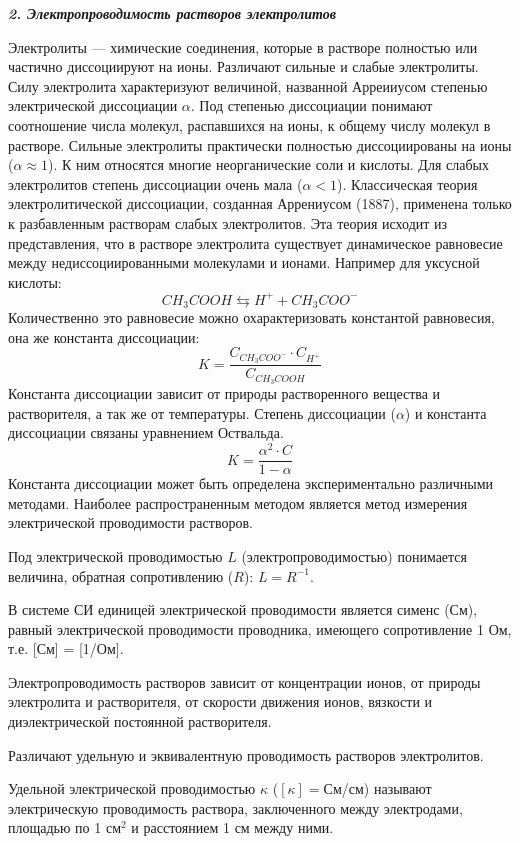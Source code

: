 \textit{\textbf{2. Электропроводимость растворов электролитов}}

Электролиты --- химические соединения,  которые в  растворе  полностью или частично диссоциируют на ионы. Различают сильные и слабые электролиты. Силу электролита характеризуют величиной, названной Арреииусом степенью электрической диссоциации $\alpha$. Под степенью диссоциации понимают соотношение числа молекул, распавшихся на ионы, к общему числу молекул в растворе. Сильные электролиты практически полностью диссоциированы на ионы ($\alpha\approx 1$). К ним относятся многие неорганические соли и кислоты. Для слабых электролитов степень диссоциации очень мала ($\alpha<1$).
Классическая теория  электролитической диссоциации,  созданная Аррениусом (1887),  применена только к разбавленным растворам слабых электролитов. Эта теория исходит из представления, что в растворе электролита существует динамическое равновесие между недиссоциированными молекулами и ионами. Например для уксусной кислоты:
$$CH_{3}COOH\leftrightarrows H^{+}+CH_{3}COO^{-}$$
Количественно это  равновесие можно охарактеризовать константой равновесия, она же константа диссоциации:
$$K=\frac{C_{CH_{3}COO^{-}}\cdot C_{H^{+}}}{C_{CH_{3}COOH}}$$
Константа диссоциации зависит от природы растворенного вещества и растворителя, а так же от температуры.
Степень диссоциации ($\alpha$) и константа диссоциации связаны уравнением Оствальда.
$$K=\frac{\alpha^{2}\cdot C}{1-\alpha}$$
Константа диссоциации  может  быть  определена экспериментально различными методами.  Наиболее распространенным  методом  является метод измерения электрической проводимости растворов.

Под электрической  проводимостью $L$ (электропроводимостью) понимается величина, обратная сопротивлению ($R$): $L = R^{-1}$.

В системе СИ единицей электрической проводимости является сименс (См),  равный  электрической  проводимости проводника, имеющего сопротивление 1 Ом, т.е. [См] = [1/Ом].

Электропроводимость растворов зависит от концентрации ионов, от природы  электролита  и растворителя,  от скорости движения ионов, вязкости и диэлектрической постоянной растворителя.

Различают удельную  и  эквивалентную  проводимость  растворов электролитов.

Удельной электрической проводимостью $\kappa$ ($[\kappa]=$См/см) называют электрическую проводимость раствора,  заключенного между  электродами, площадью по 1 см$^{2}$ и расстоянием 1 см между ними.

